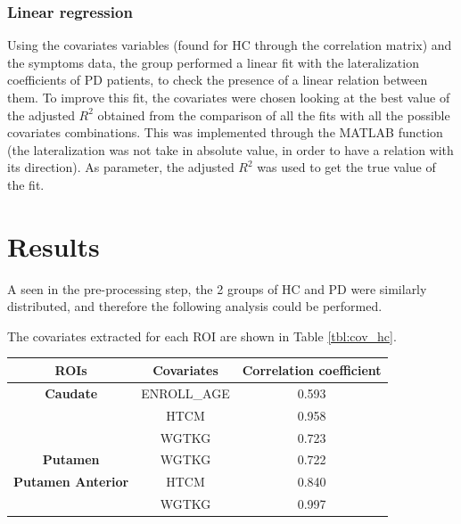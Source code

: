\documentclass[]{article}
\begin{document}
\begin{multicols}{2}
\subsubsection{Linear regression}

Using the covariates variables (found for HC through the correlation matrix) and the symptoms data, the group performed a linear fit with the lateralization coefficients of PD patients, to check the presence of a linear relation between them. To improve this fit, the covariates were chosen looking at the best value of the adjusted $R^2$ obtained from the comparison of all the fits with all the possible covariates combinations. 
This was implemented through the MATLAB function  (the lateralization was not take in absolute value, in order to have a relation with its direction).
As parameter, the adjusted $R^2$ was used to get the true value of the fit.

\section{Results}

A seen in the pre-processing step, the 2 groups of HC and PD were similarly distributed, and therefore the following analysis could be performed.

The covariates extracted for each ROI are shown in Table \ref{tbl:cov_hc}.



\begin{center}
	\centering
	\tiny
	\begin{tabular}{|c|c|c|}
		\hline
		\textbf{ROIs}             & \textbf{Covariates} & \textbf{Correlation coefficient} \\ \hline
		\textbf{Caudate}          & ENROLL\_AGE         & 0.593                            \\ \hline
		\textbf{}                 & HTCM                & 0.958                            \\ \hline
		\textbf{}                 & WGTKG               & 0.723                            \\ \hline
		\textbf{Putamen}          & WGTKG               & 0.722                            \\ \hline
		\textbf{Putamen Anterior} & HTCM                & 0.840                            \\ \hline
		\textbf{}                 & WGTKG               & 0.997                            \\ \hline
	\end{tabular}
	\label{tbl:cov_hc}
\end{center}



\end{multicols}
\end{document}
